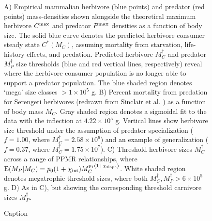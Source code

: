 \documentclass[11pt]{article}
\begin{document}
\begin{figure}[h!]
  \caption{
	  A) Empirical mammalian herbivore (blue points) and predator (red points) mass-densities shown alongside the theoretical maximum herbivore $C^{\rm max}$ and predator $P^{\rm max}$ densities as a function of body size. 
	  The solid blue curve denotes the predicted herbivore consumer steady state $C^*(M_C)$, assuming mortality from starvation, life-history effects, and predation.
	  Predicted herbivore $M_C^\dagger$ and predator $M_P^\dagger$ size thresholds (blue and red vertical lines, respectively) reveal where the herbivore consumer population is no longer able to support a predator population. 
	  The blue shaded region denotes `mega' size classes $>1\times10^5$ g.
	  B) Percent mortality from predation for Serengeti herbivores (redrawn from Sinclair et al. \citep{Sinclair2003}) as a function of body mass $M_C$. Gray shaded region denotes a sigmoidal fit to the data with the inflection at $4.22\times10^5$ g. Vertical lines show herbivore size threshold under the assumption of predator specialization ($f=1.00$, where $M_C^\dagger=2.58\times10^6$) and an example of generalization ($f=0.37$, where $M_C^\dagger=1.75\times10^7$).
	  C) Threshold herbivore sizes $M_C^\dagger$ across a range of PPMR relationships, where ${\rm E}(M_P|M_C) = p_0(1+\chi_{\rm int}) M_C^{p_1(1+\chi_{\rm slope})}$.
	  White shaded region denotes megatrophic threshold sizes, where both $M_C^\dagger,M_P^\dagger > 6\times10^5$ g. 
	  D) As in C), but showing the corresponding threshold carnivore sizes $M_P^\dagger$.
  }
  \label{fig:predrate}
\end{figure}


\begin{figure}[h!]
    \caption{Caption}
    \label{fig:harvest}
\end{figure}







\end{document}
